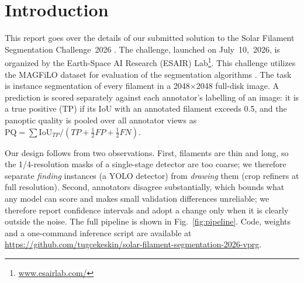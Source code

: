 \documentclass[sigconf]{acmart}
\begin{document}


\section{Introduction}
    This report goes over the details of our submitted solution to the Solar Filament Segmentation Challenge~2026 \cite{filament-segmentation-2026}. The challenge, launched on July~10,~2026, is organized by the Earth-Space AI Research (ESAIR) Lab\footnote{\href{https://www.esairlab.com/home}{www.esairlab.com/}}. This challenge utilizes the MAGFiLO dataset for evaluation of the segmentation algorithms \cite{ahmadzadeh2024dataset}. The task is instance segmentation of every filament in a 2048$\times$2048 full-disk image. A prediction is scored separately against each annotator's labelling of an image: it is a true positive (TP) if its IoU with an annotated filament exceeds 0.5, and the panoptic quality \cite{kirillov2019panoptic} is pooled over all annotator views as $\mathrm{PQ}=\sum \mathrm{IoU}_{TP}/(TP+\tfrac12 FP+\tfrac12 FN)$.

    Our design follows from two observations. First, filaments are thin and long, so the 1/4-resolution masks of a single-stage detector are too coarse; we therefore separate \emph{finding} instances (a YOLO detector) from \emph{drawing} them (crop refiners at full resolution). Second, annotators disagree substantially, which bounds what any model can score and makes small validation differences unreliable; we therefore report confidence intervals and adopt a change only when it is clearly outside the noise. The full pipeline is shown in Fig.~\ref{fig:pipeline}. Code, weights and a one-command inference script are available at \url{https://github.com/tugcekeskin/solar-filament-segmentation-2026-vprg}.
\end{document}
